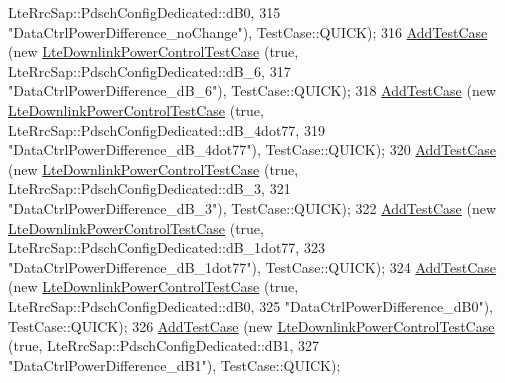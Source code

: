 \begin{DoxyCode}
      LteRrcSap::PdschConfigDedicated::dB0,
315                                                     \textcolor{stringliteral}{"DataCtrlPowerDifference\_noChange"}), TestCase::QUICK);
316   \hyperlink{classns3_1_1TestCase_a3718088e3eefd5d6454569d2e0ddd835}{AddTestCase} (\textcolor{keyword}{new} \hyperlink{classLteDownlinkPowerControlTestCase}{LteDownlinkPowerControlTestCase} (\textcolor{keyword}{true}, 
      LteRrcSap::PdschConfigDedicated::dB\_6,
317                                                     \textcolor{stringliteral}{"DataCtrlPowerDifference\_dB\_6"}), TestCase::QUICK);
318   \hyperlink{classns3_1_1TestCase_a3718088e3eefd5d6454569d2e0ddd835}{AddTestCase} (\textcolor{keyword}{new} \hyperlink{classLteDownlinkPowerControlTestCase}{LteDownlinkPowerControlTestCase} (\textcolor{keyword}{true}, 
      LteRrcSap::PdschConfigDedicated::dB\_4dot77,
319                                                     \textcolor{stringliteral}{"DataCtrlPowerDifference\_dB\_4dot77"}), TestCase::QUICK);
320   \hyperlink{classns3_1_1TestCase_a3718088e3eefd5d6454569d2e0ddd835}{AddTestCase} (\textcolor{keyword}{new} \hyperlink{classLteDownlinkPowerControlTestCase}{LteDownlinkPowerControlTestCase} (\textcolor{keyword}{true}, 
      LteRrcSap::PdschConfigDedicated::dB\_3,
321                                                     \textcolor{stringliteral}{"DataCtrlPowerDifference\_dB\_3"}), TestCase::QUICK);
322   \hyperlink{classns3_1_1TestCase_a3718088e3eefd5d6454569d2e0ddd835}{AddTestCase} (\textcolor{keyword}{new} \hyperlink{classLteDownlinkPowerControlTestCase}{LteDownlinkPowerControlTestCase} (\textcolor{keyword}{true}, 
      LteRrcSap::PdschConfigDedicated::dB\_1dot77,
323                                                     \textcolor{stringliteral}{"DataCtrlPowerDifference\_dB\_1dot77"}), TestCase::QUICK);
324   \hyperlink{classns3_1_1TestCase_a3718088e3eefd5d6454569d2e0ddd835}{AddTestCase} (\textcolor{keyword}{new} \hyperlink{classLteDownlinkPowerControlTestCase}{LteDownlinkPowerControlTestCase} (\textcolor{keyword}{true}, 
      LteRrcSap::PdschConfigDedicated::dB0,
325                                                     \textcolor{stringliteral}{"DataCtrlPowerDifference\_dB0"}), TestCase::QUICK);
326   \hyperlink{classns3_1_1TestCase_a3718088e3eefd5d6454569d2e0ddd835}{AddTestCase} (\textcolor{keyword}{new} \hyperlink{classLteDownlinkPowerControlTestCase}{LteDownlinkPowerControlTestCase} (\textcolor{keyword}{true}, 
      LteRrcSap::PdschConfigDedicated::dB1,
327                                                     \textcolor{stringliteral}{"DataCtrlPowerDifference\_dB1"}), TestCase::QUICK);

\end{DoxyCode}
